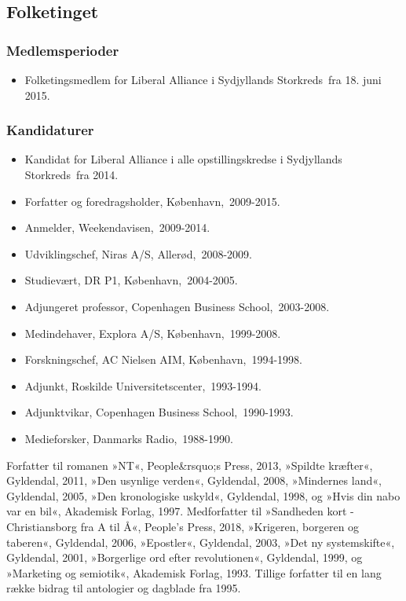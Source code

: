 \documentclass[11pt, a4paper]{awesome-cv}
\begin{document}
\begin{cvletter}
\subsection*{Folketinget}
\subsubsection*{Medlemsperioder}
\begin{itemize}
\item Folketingsmedlem for Liberal Alliance i Sydjyllands Storkreds fra 18. juni 2015.
\end{itemize}
\subsubsection*{Kandidaturer}
\begin{itemize}
\item Kandidat for Liberal Alliance i alle opstillingskredse i Sydjyllands Storkreds fra 2014.
\end{itemize}
\begin{itemize}
\item Forfatter og foredragsholder, København, 2009-2015.
\item Anmelder, Weekendavisen, 2009-2014.
\item Udviklingschef, Niras A/S, Allerød, 2008-2009.
\item Studievært, DR P1, København, 2004-2005.
\item Adjungeret professor, Copenhagen Business School, 2003-2008.
\item Medindehaver, Explora A/S, København, 1999-2008.
\item Forskningschef, AC Nielsen AIM, København, 1994-1998.
\item Adjunkt, Roskilde Universitetscenter, 1993-1994.
\item Adjunktvikar, Copenhagen Business School, 1990-1993.
\item Medieforsker, Danmarks Radio, 1988-1990.
\end{itemize}
Forfatter til romanen »NT«, People&rsquo;s Press, 2013, »Spildte kræfter«, Gyldendal, 2011, »Den usynlige verden«, Gyldendal, 2008, »Mindernes land«, Gyldendal, 2005, »Den kronologiske uskyld«, Gyldendal, 1998, og »Hvis din nabo var en bil«, Akademisk Forlag, 1997. Medforfatter til »Sandheden kort - Christiansborg fra A til Å«, People's Press, 2018, »Krigeren, borgeren og taberen«, Gyldendal, 2006, »Epostler«, Gyldendal, 2003, »Det ny systemskifte«, Gyldendal, 2001, »Borgerlige ord efter revolutionen«, Gyldendal, 1999, og »Marketing og semiotik«, Akademisk Forlag, 1993. Tillige forfatter til en lang række bidrag til antologier og dagblade fra 1995.

\end{cvletter}
\end{document}
